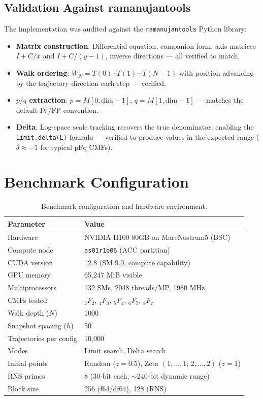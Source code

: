 \documentclass[11pt,a4paper]{article}
\begin{document}
\subsection{Validation Against ramanujantools}

The implementation was audited against the \texttt{ramanujantools} Python
library:
\begin{itemize}[leftmargin=1.5cm]
    \item \textbf{Matrix construction}: Differential equation, companion form,
    axis matrices $I + C/x$ and $I + C/(y-1)$, inverse directions --- all
    verified to match.
    \item \textbf{Walk ordering}: $W_N = T(0) \cdot T(1) \cdots T(N-1)$ with
    position advancing by the trajectory direction each step --- verified.
    \item \textbf{$p/q$ extraction}: $p = M[0, \text{dim}-1]$,
    $q = M[1, \text{dim}-1]$ --- matches the default IV/FP convention.
    \item \textbf{Delta}: Log-space scale tracking recovers the true
    denominator, enabling the \texttt{Limit.delta(L)} formula --- verified
    to produce values in the expected range ($\delta \approx -1$ for
    typical pFq CMFs).
\end{itemize}

\section{Benchmark Configuration}

\begin{table}[h]
\centering
\caption{Benchmark configuration and hardware environment.}
\label{tab:config}
\begin{tabular}{ll}
\toprule
\textbf{Parameter} & \textbf{Value} \\
\midrule
Hardware & NVIDIA H100 80GB on MareNostrum5 (BSC) \\
Compute node & \texttt{as01r1b06} (ACC partition) \\
CUDA version & 12.8 (SM 9.0, compute capability) \\
GPU memory & 65{,}247 MiB visible \\
Multiprocessors & 132 SMs, 2048 threads/MP, 1980 MHz \\
\midrule
CMFs tested & ${}_3F_2$, ${}_4F_3$, ${}_5F_4$, ${}_6F_5$, ${}_8F_7$ \\
Walk depth ($N$) & 1000 \\
Snapshot spacing ($h$) & 50 \\
Trajectories per config & 10{,}000 \\
Modes & Limit search, Delta search \\
Initial points & Random ($z=0.5$), Zeta $(1,\ldots,1;\,2,\ldots,2)$ ($z=1$) \\
RNS primes & 8 (30-bit each, $\sim$240-bit dynamic range) \\
Block size & 256 (f64/df64), 128 (RNS) \\
\bottomrule
\end{tabular}
\end{table}
\end{document}
